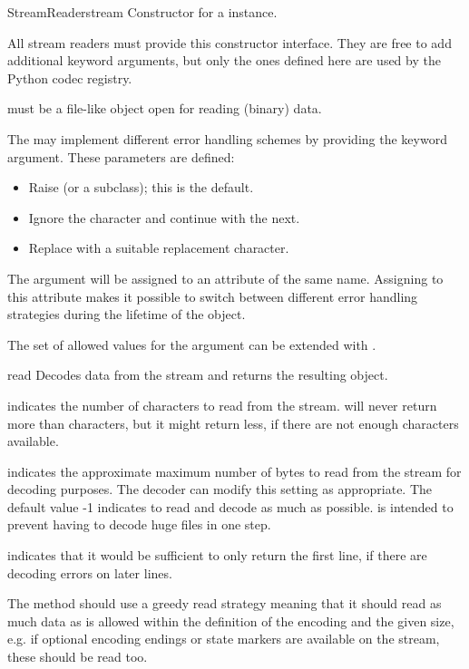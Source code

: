 \begin{classdesc}{StreamReader}{stream}
  Constructor for a  instance. 

  All stream readers must provide this constructor interface. They are
  free to add additional keyword arguments, but only the ones defined
  here are used by the Python codec registry.

   must be a file-like object open for reading (binary)
  data.

  The  may implement different error handling
  schemes by providing the  keyword argument. These
  parameters are defined:

  \begin{itemize}
    \item {} Raise  (or a subclass);
                          this is the default.
    \item {} Ignore the character and continue with the next.
    \item {} Replace with a suitable replacement character.
  \end{itemize}

  The  argument will be assigned to an attribute of the
  same name. Assigning to this attribute makes it possible to switch
  between different error handling strategies during the lifetime
  of the  object.

  The set of allowed values for the  argument can
  be extended with .
\end{classdesc}

\begin{methoddesc}{read}{}
  Decodes data from the stream and returns the resulting object.

   indicates the number of characters to read from the
  stream.  will never return more than 
  characters, but it might return less, if there are not enough
  characters available.

   indicates the approximate maximum number of bytes to read
  from the stream for decoding purposes. The decoder can modify this
  setting as appropriate. The default value -1 indicates to read and
  decode as much as possible.   is intended to prevent having
  to decode huge files in one step.

   indicates that it would be sufficient to only return
  the first line, if there are decoding errors on later lines.

  The method should use a greedy read strategy meaning that it should
  read as much data as is allowed within the definition of the encoding
  and the given size, e.g.  if optional encoding endings or state
  markers are available on the stream, these should be read too.

\end{methoddesc}

